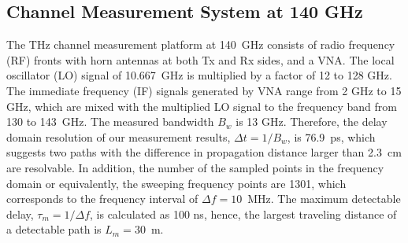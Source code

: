 \documentclass[conference]{IEEEtran}
\begin{document}
\subsection{Channel Measurement System at 140 GHz}
\par The THz channel measurement platform at 140~GHz consists of radio frequency (RF) fronts with horn antennas at both Tx and Rx sides, and a VNA. The local oscillator (LO) signal of 10.667~GHz is multiplied by a factor of 12 to 128 GHz. The immediate frequency (IF) signals generated by VNA range from 2 GHz to 15 GHz, which are mixed with the multiplied LO signal to the frequency band from 130 to 143~GHz. The measured bandwidth $B_w$ is 13 GHz. Therefore, the delay domain resolution of our measurement results, $\Delta t=1/B_w$, is 76.9~ps, which suggests two paths with the difference in propagation distance larger than 2.3~cm are resolvable. In addition, the number of the sampled points in the frequency domain or equivalently, the sweeping frequency points are 1301, which corresponds to the frequency interval of $\Delta f=10$~MHz. The maximum detectable delay, $\tau_m=1/\Delta f$, is calculated as 100 ns, hence, the largest traveling distance of a detectable path is $L_m=30$~m.
\end{document}
